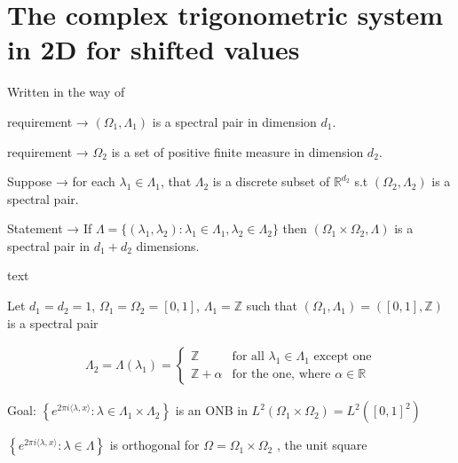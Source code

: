 \documentclass[../thesis.tex]{subfiles}
\begin{document}
\section{The complex trigonometric system in 2D for shifted values}
Written in the way of \cite{jorgensenSpectralPairsCartesian2001}

\begin{theorem}
    requirement → $(\Omega_1,\Lambda_1)$ is a spectral pair in dimension $d_1$.

    requirement →  $\Omega_2$ is a set of positive finite measure in dimension $d_2$.

    Suppose →  for each $\lambda_1 \in \Lambda_1$, that $\Lambda_2$ is a discrete subset of $\mathbb{R}^{d_2}$ s.t $(\Omega_2,\Lambda_2)$ is a spectral pair.

    Statement → If $\Lambda=\{(\lambda_1,\lambda_2): \lambda_1\in \Lambda_1, \lambda_2 \in \Lambda_2\}$ then $(\Omega_1\times\Omega_2, \Lambda)$ is a spectral pair in $d_1+d_2$ dimensions. 
\end{theorem}



\begin{example}
    text\\
\end{example}


Let $d_1=d_2=1$,  $\Omega_1 = \Omega_2=[0,1]$, $\Lambda_1 = \mathbb{Z}$ such that $(\Omega_1,\Lambda_1)=([0,1],\mathbb{Z})$ is a spectral pair


\begin{align*}
    \Lambda_2=\Lambda(\lambda_1) = \begin{cases}        
        \mathbb{Z} & \text{for all } \lambda_1 \in \Lambda_1 \text{ except one}\\        
        \mathbb{Z}+\alpha & \text{for the one, where } \alpha \in \mathbb{R}   
    \end{cases}
\end{align*}


Goal: $\left\{ e^{2\pi i \langle \lambda,x  \rangle } : \lambda \in \Lambda_1\times\Lambda_2\right\}$ is an ONB in $L^2(\Omega_1\times\Omega_2)= L^2{([0,1]^2)}$


$\left\{ e^{2\pi i \langle \lambda,x  \rangle } : \lambda \in \Lambda\right\}$ is orthogonal for $\Omega = \Omega_1 \times \Omega_2$ , the unit square
\end{document}
